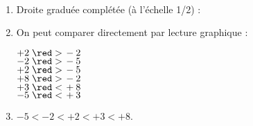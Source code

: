     \ \\ [-5mm]
    \begin{enumerate}
       \item Droite graduée complétée (à l'échelle 1/2) : \\ [2mm]
       \hspace*{-10mm} 
       \item On peut comparer directement par lecture graphique :
          \begin{multicols}{3}
             $+2 \; {\red >} \, -2$ \\ \smallskip
             $-2  \; {\red >} \, -5$ \\ \smallskip
             $+2 \; {\red >} \, -5$ \\
             $+8 \; {\red >} \, -2$ \\
             $+3 \; {\red <} \, +8$ \\
             $-5 \; {\red <} \, +3$
          \end{multicols}
          \vspace*{-3mm}
       \item \red$-5<-2<+2<+3<+8$.
    \end{enumerate}
